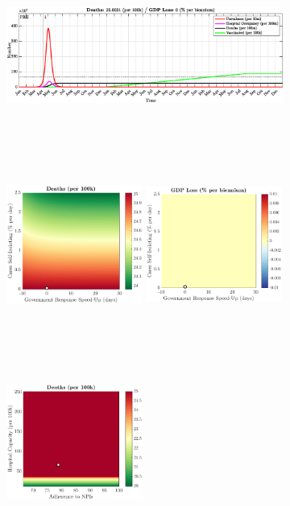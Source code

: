 \documentclass[paper=a4, fontsize=11pt]{scrartcl}
\numberwithin{figure}{section}
\numberwithin{table}{section}
\begin{document}
\begin{figure}[H]
\centering
    \begin{subfigure}[b]{\textwidth}
     	\includegraphics[width=\textwidth,height=5.5cm]{Counterfactuals/CN_swfl}
    \end{subfigure}
    \begin{subfigure}[b]{\textwidth}
      	\includegraphics[width=0.49\textwidth,height=6cm]{CN/SWINE/ero_d}
	\hspace{0.05cm}
    	\includegraphics[width=0.49\textwidth,height=6cm]{CN/SWINE/ero_g}
    \end{subfigure}
    \begin{subfigure}[b]{\textwidth}
      	\includegraphics[width=0.49\textwidth,height=6cm]{CN/SWINE/npl_d}

\end{subfigure}
\end{figure}
\end{document}
